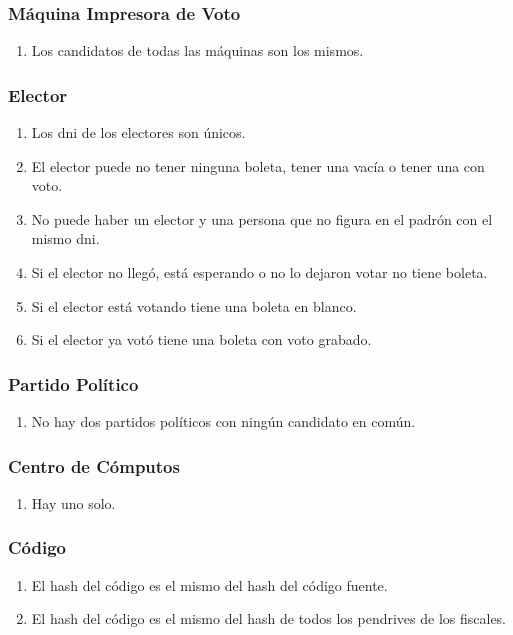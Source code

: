 \subsubsection*{M\'aquina Impresora de Voto}
\begin{enumerate}
\item Los candidatos de todas las máquinas son los mismos.

\end{enumerate}

\subsubsection*{Elector}
\begin{enumerate}
\item Los dni de los electores son únicos.
\item El elector puede no tener ninguna boleta, tener una vacía o tener una con voto.
\item No puede haber un elector y una persona que no figura en el padrón con el mismo dni.
\item Si el elector no llegó, está esperando o no lo dejaron votar no tiene boleta.
\item Si el elector está votando tiene una boleta en blanco.
\item Si el elector ya votó tiene una boleta con voto grabado.
\end{enumerate}

\subsubsection*{Partido Pol\'itico}
\begin{enumerate}
\item No hay dos partidos políticos con ningún candidato en común.
\end{enumerate}

\subsubsection*{Centro de C\'omputos}
\begin{enumerate}
\item Hay uno solo.
\end{enumerate}

\subsubsection*{C\'odigo}
\begin{enumerate}
\item El hash del código es el mismo del hash del código fuente.   
\item El hash del código es el mismo del hash de todos los pendrives de los fiscales.   
\end{enumerate}  

